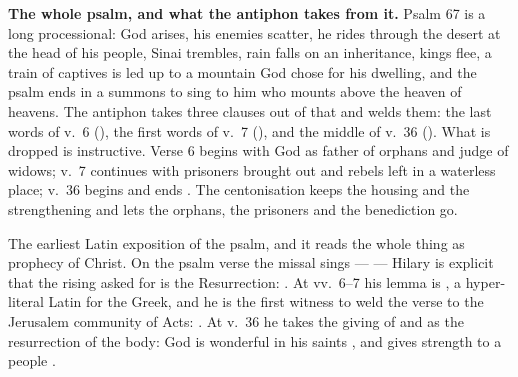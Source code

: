 
\latinpolicynote

\textbf{The whole psalm, and what the antiphon takes from it.} Psalm 67 is a
long processional: God arises, his enemies scatter, he rides through the desert
at the head of his people, Sinai trembles, rain falls on an inheritance, kings
flee, a train of captives is led up to a mountain God chose for his dwelling,
and the psalm ends in a summons to sing to him who mounts above the heaven of
heavens. The antiphon takes three clauses out of that and welds them: the last
words of v.~6 (), the first words of v.~7
(), and the middle of v.~36
(). What is dropped is
instructive. Verse 6 begins with God as father of orphans and judge of widows;
v.~7 continues with prisoners brought out and rebels left in a waterless place;
v.~36 begins  and ends
. The centonisation keeps the housing and the
strengthening and lets the orphans, the prisoners and the benediction go.

\begin{witnessnote}
The earliest Latin exposition of the psalm, and it reads the whole thing as
prophecy of Christ. On the psalm verse the missal sings ---  --- Hilary is explicit that the rising asked for is the Resurrection:
. At vv.~6--7 his lemma
is , a hyper-literal Latin for the Greek, and he is the first
witness to weld the verse to the Jerusalem community of Acts: . At v.~36 he takes the giving
of  and  as the resurrection of the body: God is
wonderful in his saints , and gives strength to a people .
\end{witnessnote}

